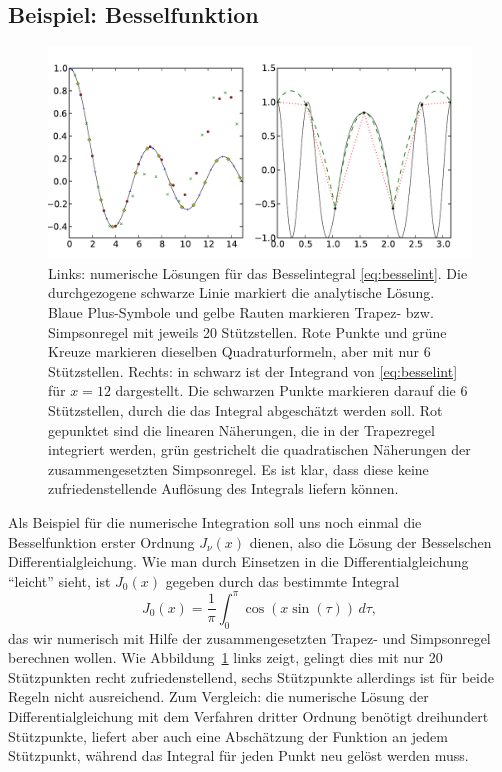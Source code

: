 \subsection{Beispiel: Besselfunktion}

\begin{figure}
  \centering
  \includegraphics[width=\textwidth]{plots/bessel_int}
  \caption{Links: numerische Lösungen für das Besselintegral
    \eqref{eq:besselint}. Die durchgezogene schwarze Linie markiert
    die analytische Lösung. Blaue Plus-Symbole und gelbe Rauten
    markieren Trapez- bzw. Simpsonregel mit jeweils 20 Stützstellen.
    Rote Punkte und grüne Kreuze markieren dieselben Quadraturformeln,
    aber mit nur 6 Stützstellen. Rechts: in schwarz ist der Integrand
    von \eqref{eq:besselint} für $x=12$ dargestellt. Die schwarzen
    Punkte markieren darauf die 6 Stützstellen, durch die das Integral
    abgeschätzt werden soll. Rot gepunktet sind die linearen
    Näherungen, die in der Trapezregel integriert werden, grün
    gestrichelt die quadratischen Näherungen der zusammengesetzten
    Simpsonregel. Es ist klar, dass diese keine zufriedenstellende
    Auflösung des Integrals liefern können.}
  \label{fig:bessel_int}
\end{figure}

Als Beispiel für die numerische Integration soll uns noch einmal die
Besselfunktion erster Ordnung $J_\nu(x)$ dienen, also die Lösung der
Besselschen Differentialgleichung. Wie man durch Einsetzen in die
Differentialgleichung "`leicht"' sieht, ist $J_0(x)$ gegeben durch das
bestimmte Integral
\begin{equation}
  \label{eq:besselint}
  J_0(x) = \frac{1}{\pi} \int_0^\pi  \cos(x\sin(\tau))\,d\tau,
\end{equation}
das wir numerisch mit Hilfe der zusammengesetzten Trapez- und
Simpsonregel berechnen wollen. Wie Abbildung~\ref{fig:bessel_int}
links zeigt, gelingt dies mit nur 20 Stützpunkten recht
zufriedenstellend, sechs Stützpunkte allerdings ist für beide Regeln
nicht ausreichend. Zum Vergleich: die numerische Lösung der
Differentialgleichung mit dem Verfahren dritter Ordnung benötigt
dreihundert Stützpunkte, liefert aber auch eine Abschätzung der
Funktion an jedem Stützpunkt, während das Integral für jeden Punkt neu
gelöst werden muss.

